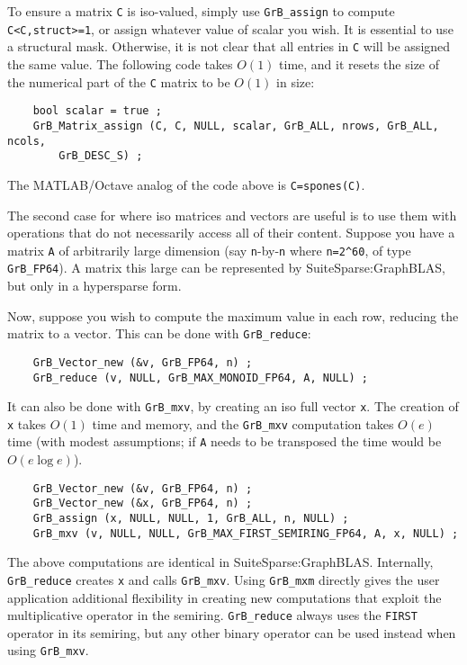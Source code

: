 \documentclass[12pt]{article}
\begin{document}
To ensure a matrix \verb'C' is iso-valued, simply use \verb'GrB_assign' to
compute \verb'C<C,struct>=1', or assign whatever value of scalar you wish.
It is essential to use a structural mask.  Otherwise, it is not clear that
all entries in \verb'C' will be assigned the same value.  The following
code takes $O(1)$ time, and it resets the size of the numerical part of the
\verb'C' matrix to be $O(1)$ in size:

{\footnotesize
\begin{verbatim}
    bool scalar = true ;
    GrB_Matrix_assign (C, C, NULL, scalar, GrB_ALL, nrows, GrB_ALL, ncols,
        GrB_DESC_S) ; \end{verbatim}}

The MATLAB/Octave analog of the code above is \verb'C=spones(C)'.

The second case for where iso matrices and vectors are useful is to use them
with operations that do not necessarily access all of their content.
Suppose you have a matrix \verb'A' of arbitrarily large dimension (say
\verb'n'-by-\verb'n' where \verb'n=2^60', of type \verb'GrB_FP64').  A matrix
this large can be represented by SuiteSparse:GraphBLAS, but only in a
hypersparse form.

Now, suppose you wish to compute the maximum value in each row, reducing the
matrix to a vector.  This can be done with \verb'GrB_reduce':

{\footnotesize
\begin{verbatim}
    GrB_Vector_new (&v, GrB_FP64, n) ;
    GrB_reduce (v, NULL, GrB_MAX_MONOID_FP64, A, NULL) ; \end{verbatim}}

It can also be done with \verb'GrB_mxv', by creating an iso full vector
\verb'x'.  The creation of \verb'x' takes $O(1)$ time and memory,
and the \verb'GrB_mxv' computation takes $O(e)$ time (with modest assumptions;
if \verb'A' needs to be transposed the time would be $O(e \log e)$).

{\footnotesize
\begin{verbatim}
    GrB_Vector_new (&v, GrB_FP64, n) ;
    GrB_Vector_new (&x, GrB_FP64, n) ;
    GrB_assign (x, NULL, NULL, 1, GrB_ALL, n, NULL) ;
    GrB_mxv (v, NULL, NULL, GrB_MAX_FIRST_SEMIRING_FP64, A, x, NULL) ; \end{verbatim}}

The above computations are identical in SuiteSparse:GraphBLAS.  Internally,
\verb'GrB_reduce' creates \verb'x' and calls \verb'GrB_mxv'.  Using
\verb'GrB_mxm' directly gives the user application additional flexibility in
creating new computations that exploit the multiplicative operator in the
semiring.  \verb'GrB_reduce' always uses the \verb'FIRST' operator in its
semiring, but any other binary operator can be used instead when using
\verb'GrB_mxv'.
\end{document}

